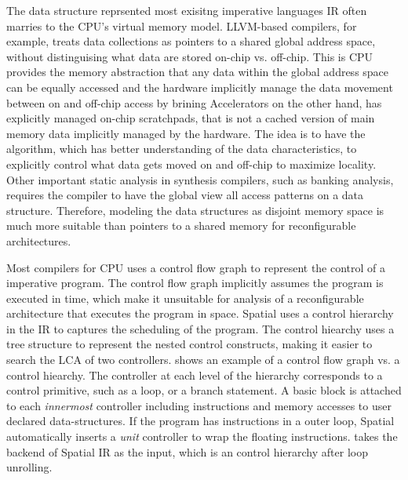 The data structure reprsented most exisitng imperative languages IR often marries to the
CPU's virtual memory model. LLVM-based compilers, for example, treats data collections as pointers to a shared
global address space, without distinguising what data are stored on-chip vs. off-chip.
This is CPU provides the memory abstraction that any data within the global address space 
can be equally accessed and the hardware implicitly manage the data movement between on and off-chip 
access by brining
Accelerators on the other hand, has explicitly managed on-chip scratchpads, that is not a cached
version of main memory data implicitly managed by the hardware.
The idea is to have the algorithm, which has better understanding of the data characteristics, to
explicitly control what data gets moved on and off-chip to maximize locality.
Other important static analysis in synthesis compilers, such as banking analysis, requires the
compiler to have the global view all access patterns on a data structure.
Therefore, modeling the data structures as disjoint memory space is much more suitable 
than pointers to a shared memory for reconfigurable architectures.

Most compilers for CPU uses a control flow graph to represent the control of a imperative program.
The control flow graph implicitly assumes the program is executed in time, which make it unsuitable
for analysis of a reconfigurable architecture that executes the program in space. 
Spatial uses a control hierarchy in the IR to captures the scheduling of the program.
The control hiearchy uses a tree structure to represent the nested control constructs, making it
easier to search the LCA of two controllers.
 shows an example of a control flow graph vs. a control hiearchy.
The controller at each level of the hierarchy corresponds to a control primitive, such as a loop, or
a branch statement. 
A basic block is attached to each \emph{innermost} controller including instructions
and memory accesses to user declared data-structures.
If the program has instructions in a outer loop, Spatial automatically inserts a \emph{unit}
controller to wrap the floating instructions.
\name takes the backend of Spatial IR as the input, which is an control hierarchy after loop
unrolling.

